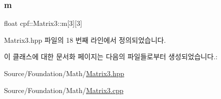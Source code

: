 \subsubsection{\texorpdfstring{m}{m}}
{\footnotesize\ttfamily float cpf\+::\+Matrix3\+::m\mbox{[}3\mbox{]}\mbox{[}3\mbox{]}}



Matrix3.\+hpp 파일의 18 번째 라인에서 정의되었습니다.



이 클래스에 대한 문서화 페이지는 다음의 파일들로부터 생성되었습니다.\+:\begin{DoxyCompactItemize}
\item 
Source/\+Foundation/\+Math/\hyperlink{_matrix3_8hpp}{Matrix3.\+hpp}\item 
Source/\+Foundation/\+Math/\hyperlink{_matrix3_8cpp}{Matrix3.\+cpp}\end{DoxyCompactItemize}
